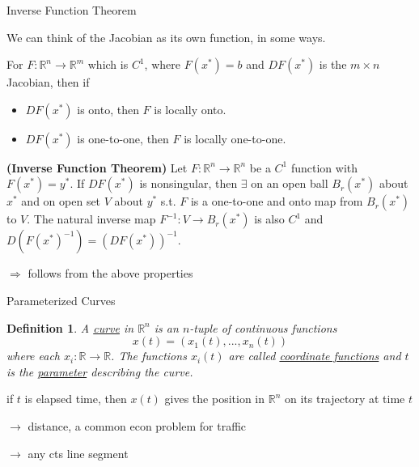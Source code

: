 \documentclass[xcolor=dvipsnames, compress, t]{beamer}
\newtheorem{defin}{Definition}
\newcommand{\vs}{\vspace{\baselineskip}}
\begin{document}
\begin{frame}{Inverse Function Theorem}

{\color{MidnightBlue} We can think of the Jacobian as its own function, in some ways.}

For $F: \mathds{R}^n \rightarrow \mathds{R}^m$ which is $C^1$, where $F(x^*) = b$ and $D{F(x^*)}$ is the $m\times n$ Jacobian, then if
\begin{itemize}
\item $D F(x^*)$ is onto, then $F$ is locally onto.
\item $D F( x^*)$ is one-to-one, then $F$ is locally one-to-one.
\end{itemize}

\pause

\begin{theorem}
{\bf (Inverse Function Theorem)} Let $F: \mathds{R}^n \rightarrow \mathds{R}^n$ be a $C^1$ function with $F(x^*) = y^*$. If $D{F(x^*)}$ is nonsingular, then $\exists$ on an open ball $B_r(x^*)$ about $x^*$ and on open set $V$ about $y^*$ s.t. $F$ is a one-to-one and onto map from $B_r(x^*)$ to $V$. The natural inverse map $F^{-1}: V \rightarrow B_r(x^*)$ is also $C^1$ and $D(F(x^*)^{-1})= (DF(x^*))^{-1}$.
\end{theorem} \pause
$\Rightarrow$ follows from the above properties

\end{frame}


\begin{frame}{Parameterized Curves}

\begin{defin}
A \underline{curve} in $\mathds{R}^n$ is an $n$-tuple of continuous functions $$x(t) = (x_1(t), ..., x_n(t))$$ where each $x_i: \mathds{R} \rightarrow \mathds{R}$. The functions $x_i(t)$ are called \underline{coordinate functions} and $t$ is the \underline{parameter} describing the curve.
\end{defin}

\vs {\bf EX//} if $t$ is elapsed time, then $x(t)$ gives the position in $\mathds{R}^n$ on its trajectory at time $t$

$\rightarrow$ distance, a common econ problem for traffic

$\rightarrow$ any cts line segment

\end{frame}
\end{document}
